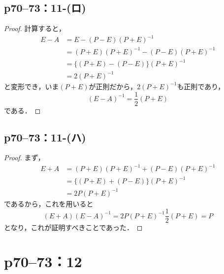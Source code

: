 \documentclass[a4paper,10pt,fleqn]{ltjsarticle}
\begin{document}
\subsection*{p70--73：11-(ロ)}

\begin{tleftbar}
  \begin{proof}

    計算すると，
    \begin{align*}
      E-A & = E-(P-E) (P+E)^{-1}                 \\
          & = (P+E)(P+E)^{-1} - (P-E) (P+E)^{-1} \\
          & = \{ (P+E)-(P-E) \} (P+E)^{-1}       \\
          & = 2(P+E)^{-1}
    \end{align*}
    と変形でき，いま$(P+E)$が正則だから，$2(P+E)^{-1}$も正則であり，
    \[
      (E-A)^{-1} = \frac{1}{2} (P+E)
    \]
    である．
  \end{proof}
\end{tleftbar}


\subsection*{p70--73：11-(ハ)}

\begin{tleftbar}
  \begin{proof}
    まず，
    \begin{align*}
      E+A & =(P+E)(P+E)^{-1}+(P-E) (P+E)^{-1} \\
          & = \{ (P+E)+(P-E) \} (P+E)^{-1}    \\
          & = 2P (P+E)^{-1}
    \end{align*}
    であるから，これを用いると
    \[
      (E+A)(E-A)^{-1} = 2P (P+E)^{-1} \frac{1}{2} (P+E) =P
    \]
    となり，これが証明すべきことであった．
  \end{proof}
\end{tleftbar}

\newpage
\section*{p70--73：12}
\end{document}
